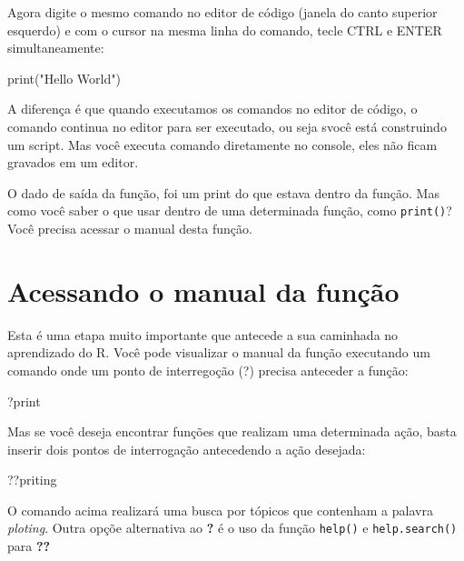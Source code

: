 \documentclass[
]{book}
\newenvironment{Shaded}{\begin{snugshade}}{\end{snugshade}}
\newcommand{\FunctionTok}[1]{\textcolor[rgb]{0.00,0.00,0.00}{#1}}
\newcommand{\NormalTok}[1]{#1}
\newcommand{\StringTok}[1]{\textcolor[rgb]{0.31,0.60,0.02}{#1}}
\theoremstyle{definition}
\theoremstyle{definition}
\theoremstyle{definition}
\theoremstyle{definition}
\theoremstyle{remark}
\begin{document}
Agora digite o mesmo comando no editor de código (janela do canto superior esquerdo) e com o cursor na mesma linha do comando, tecle CTRL e ENTER simultaneamente:

\begin{Shaded}
\begin{Highlighting}[]
\FunctionTok{print}\NormalTok{(}\StringTok{"Hello World"}\NormalTok{)}
\end{Highlighting}
\end{Shaded}

A diferença é que quando executamos os comandos no editor de código, o comando continua no editor para ser executado, ou seja svocê está construindo um script. Mas você executa comando diretamente no console, eles não ficam gravados em um editor.

O dado de saída da função, foi um print do que estava dentro da função. Mas como você saber o que usar dentro de uma determinada função, como \texttt{print()}? Você precisa acessar o manual desta função.

\hypertarget{acessando-o-manual-da-funuxe7uxe3o}{%
\section{Acessando o manual da função}\label{acessando-o-manual-da-funuxe7uxe3o}}

Esta é uma etapa muito importante que antecede a sua caminhada no aprendizado do R. Você pode visualizar o manual da função executando um comando onde um ponto de interregoção (?) precisa anteceder a função:

\begin{Shaded}
\begin{Highlighting}[]
\NormalTok{?print}
\end{Highlighting}
\end{Shaded}

Mas se você deseja encontrar funções que realizam uma determinada ação, basta inserir dois pontos de interrogação antecedendo a ação desejada:

\begin{Shaded}
\begin{Highlighting}[]
\NormalTok{??priting}
\end{Highlighting}
\end{Shaded}

O comando acima realizará uma busca por tópicos que contenham a palavra \emph{ploting}. Outra opçõe alternativa ao \textbf{?} é o uso da função \texttt{help()} e \texttt{help.search()} para \textbf{??}
\end{document}
